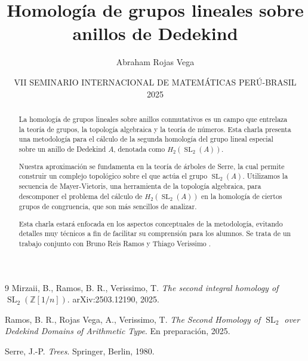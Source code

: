 \documentclass[12pt]{article}
\title{Homología de grupos lineales sobre anillos de Dedekind}
\author{Abraham Rojas Vega}
\date{VII SEMINARIO INTERNACIONAL DE MATEMÁTICAS PERÚ-BRASIL 2025}
\begin{document}
\maketitle

\begin{abstract}
La homología de grupos lineales sobre anillos conmutativos es un campo que entrelaza la teoría de grupos, la topología algebraica y la teoría de números. Esta charla presenta una metodología para el cálculo de la segunda homología del grupo lineal especial sobre un anillo de Dedekind $A$, denotada como $H_2 (\operatorname{SL}_2 (A))$.

Nuestra aproximación se fundamenta en la teoría de árboles de Serre, la cual permite construir un complejo topológico sobre el que actúa el grupo $\operatorname{SL}_2 (A)$. Utilizamos la secuencia de Mayer-Vietoris, una herramienta de la topología algebraica, para descomponer el problema del cálculo de $H_2 (\operatorname{SL}_2 (A))$ en la homología de ciertos grupos de congruencia, que son más sencillos de analizar.

Esta charla estará enfocada en los aspectos conceptuales de la metodología, evitando detalles muy técnicos a fin de facilitar su comprensión para los alumnos. Se trata de un trabajo conjunto con Bruno Reis Ramos y Thiago Verissimo \cite{principal}.

\end{abstract}

\begin{thebibliography}{9}
\small
{}
Mirzaii, B., Ramos, B. R., Verissimo, T.
\textit{The second integral homology of $\operatorname{SL}_2(\mathbb{Z}[1/n])$}.
arXiv:2503.12190, 2025.


Ramos, B. R., Rojas Vega, A., Verissimo, T.
\textit{The Second Homology of $\operatorname{SL}_2$ over Dedekind Domains of Arithmetic Type}.
En preparación, 2025.

Serre, J.-P.
\textit{Trees}.
Springer, Berlin, 1980.

\end{thebibliography}
\end{document}
